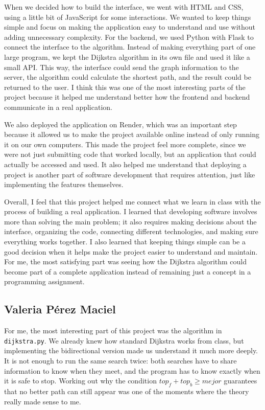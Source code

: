 \documentclass[11pt,letterpaper]{article}
\newcommand{\code}[1]{\texttt{#1}}
\begin{document}
When we decided how to build the interface, we went with HTML and CSS, using a little bit of JavaScript for some interactions. We wanted to keep things simple and focus on making the application easy to understand and use without adding unnecessary complexity. For the backend, we used Python with Flask to connect the interface to the algorithm. Instead of making everything part of one large program, we kept the Dijkstra algorithm in its own file and used it like a small API. This way, the interface could send the graph information to the server, the algorithm could calculate the shortest path, and the result could be returned to the user. I think this was one of the most interesting parts of the project because it helped me understand better how the frontend and backend communicate in a real application.

We also deployed the application on Render, which was an important step because it allowed us to make the project available online instead of only running it on our own computers. This made the project feel more complete, since we were not just submitting code that worked locally, but an application that could actually be accessed and used. It also helped me understand that deploying a project is another part of software development that requires attention, just like implementing the features themselves.

Overall, I feel that this project helped me connect what we learn in class with the process of building a real application. I learned that developing software involves more than solving the main problem; it also requires making decisions about the interface, organizing the code, connecting different technologies, and making sure everything works together. I also learned that keeping things simple can be a good decision when it helps make the project easier to understand and maintain. For me, the most satisfying part was seeing how the Dijkstra algorithm could become part of a complete application instead of remaining just a concept in a programming assignment.

\subsection*{Valeria Pérez Maciel}
For me, the most interesting part of this project was the algorithm in \code{dijkstra.py}. We already knew how standard Dijkstra works from class, but implementing the bidirectional version made us understand it much more deeply. It is not enough to run the same search twice: both searches have to share information to know when they meet, and the program has to know exactly when it is safe to stop. Working out why the condition $top_f + top_b \ge mejor$ guarantees that no better path can still appear was one of the moments where the theory really made sense to me.
\end{document}
